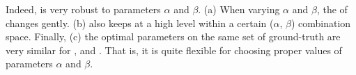 Indeed, \ensemblerank is very robust to parameters $\alpha$ and $\beta$.
(a) When varying $\alpha$ and $\beta$, the \PairAcc of \ensemblerank changes gently. (b) \PairAcc also keeps at a high level within a certain ($\alpha$, $\beta$)  combination space. Finally, (c) the optimal parameters on the same set of ground-truth are very similar for \aan, \aminer and \magdata. That is, it is quite flexible for choosing proper values
of  parameters $\alpha$ and $\beta$.


